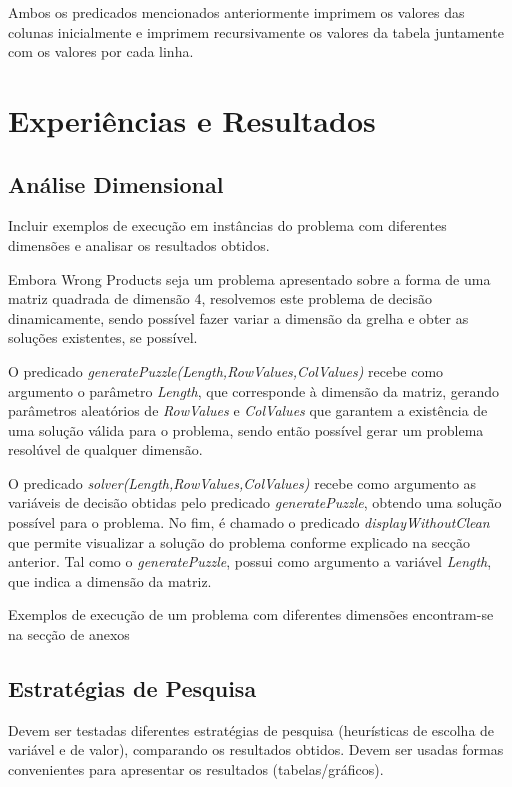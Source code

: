 \documentclass[11pt]{article}
\begin{document}
Ambos os predicados mencionados anteriormente imprimem os valores das colunas inicialmente
e imprimem recursivamente os valores da tabela juntamente com os valores por cada linha.

\section{Experiências e Resultados}

\subsection{Análise Dimensional} Incluir exemplos de execução em instâncias do problema com
diferentes dimensões e analisar os resultados obtidos.

Embora Wrong Products seja um problema apresentado sobre a forma de uma matriz quadrada de dimensão 4, resolvemos este problema de decisão dinamicamente, sendo possível fazer variar a dimensão da grelha e obter as soluções existentes, se possível.

O predicado \emph{generatePuzzle(Length,RowValues,ColValues)} recebe como argumento o parâmetro \emph{Length}, que corresponde à dimensão da matriz, gerando parâmetros aleatórios de \emph{RowValues} e \emph{ColValues} que garantem a existência de uma solução válida para o problema, sendo então possível gerar um problema resolúvel de qualquer dimensão.

O predicado \emph{solver(Length,RowValues,ColValues)} recebe como argumento as variáveis de decisão obtidas pelo predicado \emph{generatePuzzle}, obtendo uma solução possível para o problema. No fim, é chamado o predicado \emph{displayWithoutClean} que permite visualizar a solução do problema conforme explicado na secção anterior. Tal como o \emph{generatePuzzle}, possui como argumento a variável \emph{Length}, que indica a dimensão da matriz.


Exemplos de execução de um problema com diferentes dimensões encontram-se na secção de anexos



\subsection{Estratégias de Pesquisa} Devem ser testadas diferentes estratégias de pesquisa
(heurísticas de escolha de variável e de valor), comparando os resultados obtidos.
Devem ser usadas formas convenientes para apresentar os resultados (tabelas/gráficos).
\end{document}
